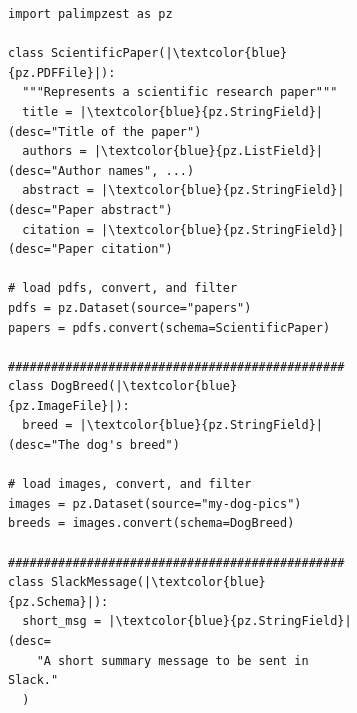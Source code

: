 \begin{figure}[t!]
    \begin{subfigure}[t]{0.55\textwidth}
        \begin{verbatim}
import palimpzest as pz

class ScientificPaper(|\textcolor{blue}{pz.PDFFile}|):
  """Represents a scientific research paper"""
  title = |\textcolor{blue}{pz.StringField}|(desc="Title of the paper")
  authors = |\textcolor{blue}{pz.ListField}|(desc="Author names", ...)
  abstract = |\textcolor{blue}{pz.StringField}|(desc="Paper abstract")
  citation = |\textcolor{blue}{pz.StringField}|(desc="Paper citation")

# load pdfs, convert, and filter
pdfs = pz.Dataset(source="papers")
papers = pdfs.convert(schema=ScientificPaper)

###############################################
class DogBreed(|\textcolor{blue}{pz.ImageFile}|):
  breed = |\textcolor{blue}{pz.StringField}|(desc="The dog's breed")

# load images, convert, and filter
images = pz.Dataset(source="my-dog-pics")
breeds = images.convert(schema=DogBreed)

###############################################
class SlackMessage(|\textcolor{blue}{pz.Schema}|):
  short_msg = |\textcolor{blue}{pz.StringField}|(desc=
    "A short summary message to be sent in Slack."
  )


\end{verbatim}
\end{subfigure}
\end{figure}
